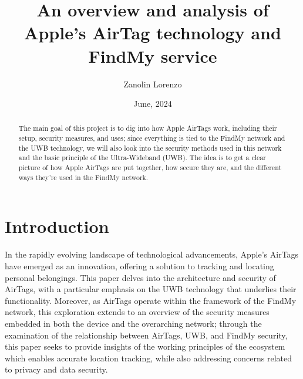 \documentclass[english]{article}
\title{An overview and analysis of Apple’s AirTag technology and FindMy service}
\author{Zanolin Lorenzo}
\date{June, 2024}
\begin{document}
\maketitle

\tableofcontents
\newpage


\begin{abstract}
  The main goal of this project is to dig into how Apple AirTags work, including their setup, security measures, and uses; since everything is tied to the FindMy network and the UWB technology, we will also look into the security methods used in this network and the basic principle of the Ultra-Wideband (UWB). The idea is to get a clear picture of how Apple AirTags are put together, how secure they are, and the different ways they're used in the FindMy network.
\end{abstract}

\section{Introduction}\label{sec:intro}
In the rapidly evolving landscape of technological advancements, Apple's AirTags have emerged as an innovation, offering a solution to tracking and locating personal belongings. This paper delves into the architecture and security of AirTags, with a particular emphasis on the UWB technology that underlies their functionality. Moreover, as AirTags operate within the framework of the FindMy network, this exploration extends to an overview of the security measures embedded in both the device and the overarching network; through the examination of the relationship between AirTags, UWB, and FindMy security, this paper seeks to provide insights of the working principles of the ecosystem which enables accurate location tracking, while also addressing concerns related to privacy and data security. 

\end{document}
